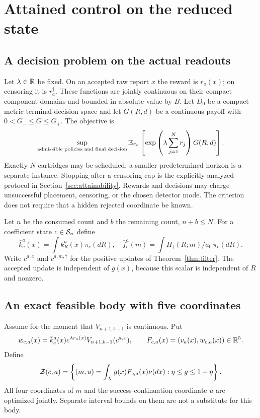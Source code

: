 \section{Attained control on the reduced state}\label{sec:control}
\subsection{A decision problem on the actual readouts}
Let $\lambda\in\mathbb R$ be fixed. On an accepted raw report $x$ the reward is
$r_a(x)$; on censoring it is $r_a^\dagger$. These functions are jointly
continuous on their compact component domains and bounded in absolute value
by $B$. Let $D_0$ be a compact metric terminal-decision space and let
$G(R,d)$ be a continuous payoff with $0<G_-\le G\le G_+$. The objective is
\begin{equation}
 \sup_{\text{admissible policies and final decision}}
 \mathbb E_{\pi_0}\left[\exp\left(\lambda\sum_{j=1}^N r_j\right)G(R,d)\right].
 \label{eq:objective}
\end{equation}
Exactly $N$ cartridges may be scheduled; a smaller predetermined horizon is
a separate instance. Stopping after a censoring cap is the explicitly
analyzed protocol in Section~\ref{sec:attainability}. Rewards and decisions
may charge unsuccessful placement, censoring, or the chosen detector mode.
The criterion does not require that a hidden rejected coordinate be known.

Let $n$ be the consumed count and $b$ the remaining count, $n+b\le N$.
For a coefficient state $c\in\mathcal S_n$ define
\[
 \bar k_c^a(x)=\int k_R^a(x)\pi_c(dR),\quad
 \bar f_c^a(m)=\int H_\dagger(R;m)/a_0\,\pi_c(dR).
\]
Write $c^{a,x}$ and $c^{a,m,\dagger}$ for the positive updates of
Theorem~\ref{thm:filter}. The accepted update is independent of $g(x)$,
because this scalar is independent of $R$ and nonzero.

\subsection{An exact feasible body with five coordinates}
Assume for the moment that $V_{n+1,b-1}$ is continuous. Put
\[
 w_{c,a}(x)=\bar k_c^a(x)e^{\lambda r_a(x)}
                    V_{n+1,b-1}(c^{a,x}),\qquad
 F_{c,a}(x)=(v_a(x),w_{c,a}(x))\in\mathbb R^5.
\]
Define
\begin{equation}
 \mathcal Z(c,a)=\left\{(m,u)=\int_X g(x)F_{c,a}(x)\nu(dx):
                               \eta\le g\le1-\eta\right\}.
 \label{eq:gate-body}
\end{equation}
All four coordinates of $m$ and the success-continuation coordinate $u$
are optimized jointly. Separate interval bounds on them are not a substitute
for this body.

